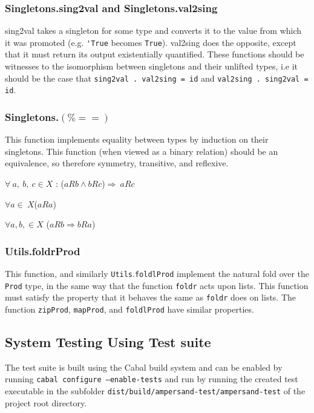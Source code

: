 \subsubsection*{Singletons.sing2val and Singletons.val2sing}
sing2val takes a singleton for some type and converts it to the value
from which it was promoted (e.g. \lstinline{'True} becomes \lstinline{True}).
val2sing does the opposite, except that it must return its output 
existentially quantified. These functions should be witnesses to the isomorphism
between singletons and their unlifted types, i.e it should be the case
that \lstinline{sing2val . val2sing = id} and \lstinline{val2sing . sing2val = id}. 


\subsubsection*{Singletons.$\boldsymbol{(\%==)}$} 
This function implements equality between types by induction on their singletons.
This function (when viewed as a binary relation) should be an equivalence, 
so therefore symmetry, transitive, and reflexive. 

\begin{description}[labelindent=1cm]
\item[Transitivity] $\forall\ a,\ b,\ c \in  X$ : ($aRb \wedge bRc$)$ \Rightarrow\ aRc$
\item[Reflexivity] $\forall a \in\ X $($aRa$)  
\item[Symmetry] $\forall a, b, \in X$ ($aRb \Rightarrow bRa$) 
\end{description}

\subsubsection*{Utils.foldrProd}
This function, and similarly \lstinline{Utils}.\lstinline{foldlProd} implement
the natural fold over the \lstinline{Prod} type, in the same way that 
the function \lstinline{foldr} acts upon lists. This function
must satisfy the property that it behaves the same as \lstinline{foldr}
does on lists. The function \lstinline{zipProd}, \lstinline{mapProd}, and \lstinline{foldlProd}
have similar properties. 


\subsection{System Testing Using Test suite}
The test suite is built using the Cabal build system and can be 
enabled by running \texttt{cabal configure --enable-tests} and
run by running the created test executable in the subfolder
\texttt{dist/build/ampersand-test/ampersand-test} of the 
project root directory. 

